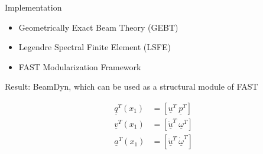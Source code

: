         \item
        Implementation
        \begin{itemize}
            \item
            Geometrically Exact Beam Theory (GEBT) \citep{HodgesBeamBook}
            \item
            Legendre Spectral Finite Element (LSFE) \citep{Sprague:2003}
            \item
            FAST Modularization Framework \citep{Jonkman:2013}
        \end{itemize}
        \item
        Result: BeamDyn, which can be used as a structural module of FAST
        
        
            \begin{align*}
    \underline{q}^T(x_1) &=\left[
    \underline{u}^T ~ \underline{p}^T\right] \\
    \underline{v}^T(x_1) &=\left[
    \underline{\dot{u}}^T~\underline{\omega}^T \right] \\
    \underline{a}^T(x_1)&=\left[\ddot{\underline{u}}^T ~ \dot{\underline{\omega}}^T \right]
    \end{align*}